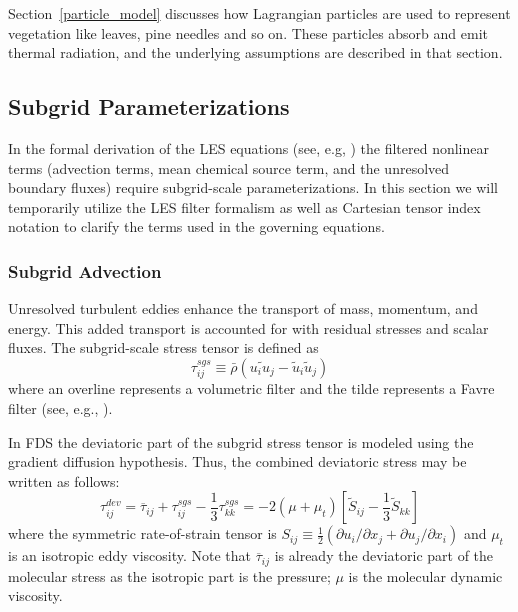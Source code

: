 \documentclass[journal,article,atmosphere,submit,moreauthors,pdftex]{Definitions/mdpi}
\begin{document}
Section~\ref{particle_model} discusses how Lagrangian particles are used to represent vegetation like leaves, pine needles and so on. These particles absorb and emit thermal radiation, and the underlying assumptions are described in that section.

\subsection{Subgrid Parameterizations} \label{sec:subgrid}

In the formal derivation of the LES equations (see, e.g, \cite{Pope:2000,FDS_Math_Guide}) the filtered nonlinear terms (advection terms, mean chemical source term, and the unresolved boundary fluxes) require subgrid-scale parameterizations.  In this section we will temporarily utilize the LES filter formalism as well as Cartesian tensor index notation to clarify the terms used in the governing equations.

\subsubsection{Subgrid Advection}

Unresolved turbulent eddies enhance the transport of mass, momentum, and energy.  This added transport is accounted for with residual stresses and scalar fluxes.  The subgrid-scale stress tensor is defined as
\begin{equation}
\tau_{ij}^{sgs} \equiv \bar{\rho}(\widetilde{u_i u_j} - \tilde{u}_i \tilde{u}_j)
\end{equation}
where an overline represents a volumetric filter and the tilde represents a Favre filter (see, e.g., \cite{Poinsot:TNC}).

In FDS the deviatoric part of the subgrid stress tensor is modeled using the gradient diffusion hypothesis.  Thus, the combined deviatoric stress may be written as follows:
\begin{equation}
\tau_{ij}^{dev} = \overline{\tau}_{ij} + \tau_{ij}^{sgs} - \frac{1}{3} \tau_{kk}^{sgs} = -2 (\mu + \mu_t) \left[ \tilde{S}_{ij} - \frac{1}{3} \tilde{S}_{kk} \right]
\end{equation}
where the symmetric rate-of-strain tensor is $S_{ij} \equiv \frac{1}{2}(\partial u_i/\partial x_j + \partial u_j/\partial x_i)$ and $\mu_t$ is an isotropic eddy viscosity.  Note that $\overline{\tau}_{ij}$ is already the deviatoric part of the molecular stress as the isotropic part is the pressure; $\mu$ is the molecular dynamic viscosity.
\end{document}
